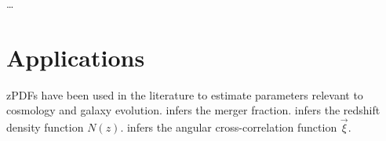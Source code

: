 \documentclass[12pt, onecolumn]{emulateapj}
\begin{document}
\dots

\section{Applications}

zPDFs have been used in the literature to estimate parameters relevant to cosmology and galaxy evolution.  \citet{lop14} infers the merger fraction.  \citet{she11} infers the redshift density function $N(z)$.  \citet{mye09} infers the angular cross-correlation function $\vec{\xi}$.




\end{document}
